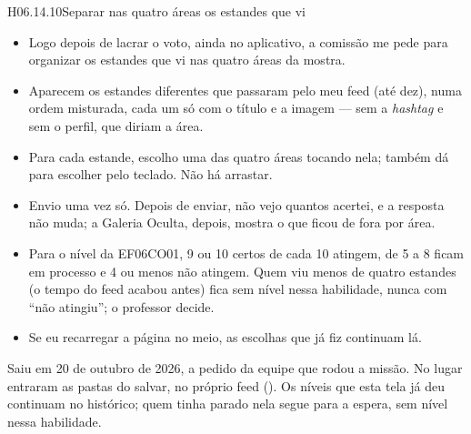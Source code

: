 \begin{historia}{H06.14.10}{Separar nas quatro áreas os estandes que vi}{\arquivada}
\aceite
\begin{itemize}
  \item Logo depois de lacrar o voto, ainda no aplicativo, a comissão me pede
    para organizar os estandes que vi nas quatro áreas da mostra.
  \item Aparecem os estandes diferentes que passaram pelo meu feed (até dez),
    numa ordem misturada, cada um só com o título e a imagem --- sem a
    \emph{hashtag} e sem o perfil, que diriam a área.
  \item Para cada estande, escolho uma das quatro áreas tocando nela; também
    dá para escolher pelo teclado. Não há arrastar.
  \item Envio uma vez só. Depois de enviar, não vejo quantos acertei, e a
    resposta não muda; a Galeria Oculta, depois, mostra o que ficou de fora
    por área.
  \item Para o nível da EF06CO01, 9 ou 10 certos de cada 10 atingem, de 5 a 8
    ficam em processo e 4 ou menos não atingem. Quem viu menos de quatro
    estandes (o tempo do feed acabou antes) fica sem nível nessa habilidade,
    nunca com \enquote{não atingiu}; o professor decide.
  \item Se eu recarregar a página no meio, as escolhas que já fiz continuam
    lá.
\end{itemize}
Saiu em 20 de outubro de 2026, a pedido da equipe que rodou a missão. No lugar entraram as pastas do salvar, no próprio feed
(). Os níveis que esta tela já deu continuam no histórico; quem
tinha parado nela segue para a espera, sem nível nessa habilidade.
\end{historia}

